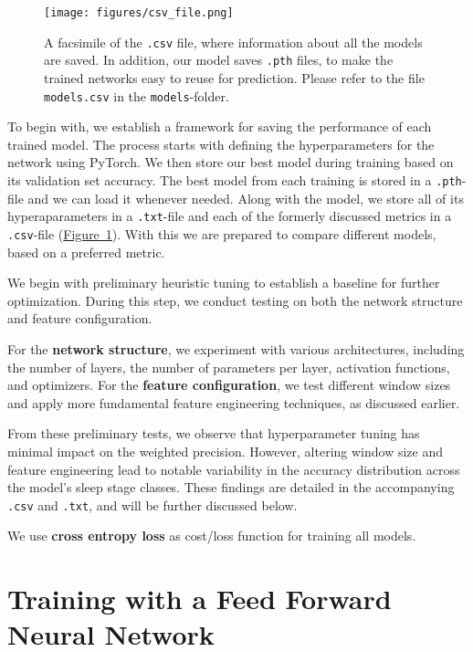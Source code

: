 \documentclass{article}
\begin{document}
\begin{figure}[H]
    \centering
    \texttt{[image: figures/csv\_file.png]} 
    \caption{A facsimile of the \texttt{.csv} file, where information about all the models are saved. In addition, our model saves \texttt{.pth} files, to make the trained networks easy to reuse for prediction. Please refer to the file \texttt{models.csv} in the \texttt{models}-folder.}
    \label{fig:csv_file}
\end{figure}

\begin{multicols}{2}
To begin with, we establish a framework for saving the performance of each trained model. The process starts with defining the hyperparameters for the network using PyTorch. We then store our best model during training based on its validation set accuracy. The best model from each training is stored in a \texttt{.pth}-file and we can load it whenever needed. Along with the model, we store all of its hyperaparameters in a \texttt{.txt}-file and each of the formerly discussed metrics in a \texttt{.csv}-file (\hyperref[fig:csv_file]{Figure~\ref*{fig:csv_file}}). With this we are prepared to compare different models, based on a preferred metric.

We begin with preliminary heuristic tuning to establish a baseline for further optimization. During this step, we conduct testing on both the network structure and feature configuration.

For the \textbf{network structure}, we experiment with various architectures, including the number of layers, the number of parameters per layer, activation functions, and optimizers. For the \textbf{feature configuration}, we test different window sizes and apply more fundamental feature engineering techniques, as discussed earlier.

From these preliminary tests, we observe that hyperparameter tuning has minimal impact on the weighted precision. However, altering window size and feature engineering lead to notable variability in the accuracy distribution across the model's sleep stage classes. These findings are detailed in the accompanying \texttt{.csv} and \texttt{.txt}, and will be further discussed below. 

We use \textbf{cross entropy loss} \cite{brovold_less_2024} \cite{hastie_elements_2009} as cost/loss function for training all models.

\end{multicols}
\section*{Training with a Feed Forward Neural Network}
\end{document}
